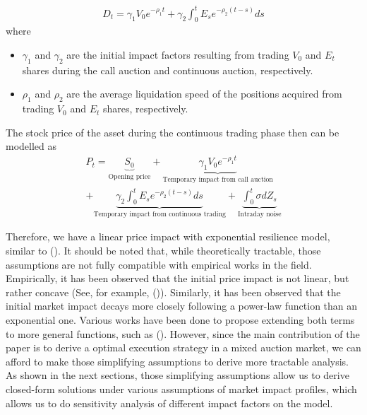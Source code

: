 \documentclass{article}
\begin{document}
\begin{equation}\label{resilence_eqn}
  \begin{split}
    D_t =\gamma_1 V_0 e^{-\rho_1 t} + \gamma_2 \int_0^t E_s e^{-\rho_2 (t-s)} ds
  \end{split}
\end{equation}
where
\begin{itemize}
  \item $\gamma_1$ and $\gamma_2$ are the initial impact factors resulting from trading $V_0$ and $E_t$ shares during the call auction and continuous auction, respectively.
  \item $\rho_1$ and $\rho_2$ are the average liquidation speed of the positions acquired from trading $V_0$ and $E_t$ shares, respectively.
\end{itemize}
The stock price of the asset during the continuous trading phase then can be modelled as
\begin{equation}\label{resilence_eqn}
  \begin{split}
    P_t = \underbrace{S_0}_{\text{Opening price}} + \underbrace{\gamma_1 V_0 e^{-\rho_1 t}}_{\text{Temporary impact from call auction}} \\+ \underbrace{\gamma_2 \int_0^t E_s e^{-\rho_2 (t-s)} ds}_{\text{Temporary impact from continuous trading}} +  \underbrace{\int_0^t \sigma dZ_s}_{\text{Intraday noise}}
  \end{split}
\end{equation}

Therefore, we have a linear price impact with exponential resilience model, similar to (\cite{Obizhaeva2013}). It should be noted that, while theoretically tractable, those assumptions are not fully compatible with empirical works in the field. Empirically, it has been observed that the initial price impact is not linear, but rather concave (See, for example, (\cite{Eisler2009})). Similarly, it has been observed that the initial market impact decays more closely following a power-law function than an exponential one. Various works have been done to propose extending both terms to more general functions, such as (\cite{Alfonsi2010}). However, since the main contribution of the paper is to derive a optimal execution strategy in a mixed auction market, we can afford to make those simplifying assumptions to derive more tractable analysis. As shown in the next sections, those simplifying assumptions allow us to derive closed-form solutions under various assumptions of market impact profiles, which allows us to do sensitivity analysis of different impact factors on the model.
\end{document}
